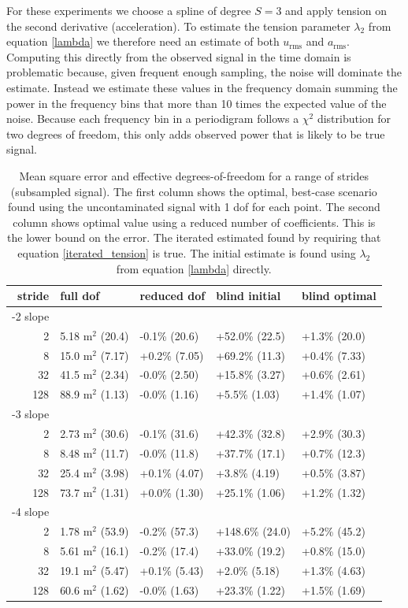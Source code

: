 \documentclass[10pt,journal]{IEEEtran}
\begin{document}
For these experiments we choose a spline of degree $S=3$ and apply tension on the second derivative (acceleration). To estimate the tension parameter $\lambda_2$ from equation \ref{lambda} we therefore need an estimate of both $u_{\textrm{rms}}$ and $a_{\textrm{rms}}$. Computing this directly from the observed signal in the time domain is problematic because, given frequent enough sampling, the noise will dominate the estimate. Instead we estimate these values in the frequency domain summing the power in the frequency bins that more than 10 times the expected value of the noise. Because each frequency bin in a periodigram follows a $\chi^2$ distribution for two degrees of freedom, this only adds observed power that is likely to be true signal.

\begin{table}[ht]
\caption{Mean square error and effective degrees-of-freedom for a range of strides (subsampled signal). The first column shows the optimal, best-case scenario found using the uncontaminated signal with 1 dof for each point. The second column shows optimal value using a reduced number of coefficients. This is the lower bound on the error. The iterated estimated found by requiring that equation \ref{iterated_tension} is true. The initial estimate is found using $\lambda_2$ from equation \ref{lambda} directly. }
\label{fit_results}
\centering
\begin{tabular}{r | llll} stride & full dof & reduced dof & blind initial & blind optimal \\ \hline \hline 
-2 slope &&&&  \\ \hline 
2 & 5.18 m$^2$ (20.4) &  -0.1\% (20.6) &  +52.0\% (22.5) &  +1.3\% (20.0) \\ 
8 & 15.0 m$^2$ (7.17) &  +0.2\% (7.05) &  +69.2\% (11.3) &  +0.4\% (7.33) \\ 
32 & 41.5 m$^2$ (2.34) &  -0.0\% (2.50) &  +15.8\% (3.27) &  +0.6\% (2.61) \\ 
128 & 88.9 m$^2$ (1.13) &  -0.0\% (1.16) &  +5.5\% (1.03) &  +1.4\% (1.07) \\ 
-3 slope &&&&  \\ \hline 
2 & 2.73 m$^2$ (30.6) &  -0.1\% (31.6) &  +42.3\% (32.8) &  +2.9\% (30.3) \\ 
8 & 8.48 m$^2$ (11.7) &  -0.0\% (11.8) &  +37.7\% (17.1) &  +0.7\% (12.3) \\ 
32 & 25.4 m$^2$ (3.98) &  +0.1\% (4.07) &  +3.8\% (4.19) &  +0.5\% (3.87) \\ 
128 & 73.7 m$^2$ (1.31) &  +0.0\% (1.30) &  +25.1\% (1.06) &  +1.2\% (1.32) \\ 
-4 slope &&&&  \\ \hline 
2 & 1.78 m$^2$ (53.9) &  -0.2\% (57.3) &  +148.6\% (24.0) &  +5.2\% (45.2) \\ 
8 & 5.61 m$^2$ (16.1) &  -0.2\% (17.4) &  +33.0\% (19.2) &  +0.8\% (15.0) \\ 
32 & 19.1 m$^2$ (5.47) &  +0.1\% (5.43) &  +2.0\% (5.18) &  +1.3\% (4.63) \\ 
128 & 60.6 m$^2$ (1.62) &  -0.0\% (1.63) &  +23.3\% (1.22) &  +1.5\% (1.69) \\ 
\end{tabular} 

\end{table}
\end{document}
